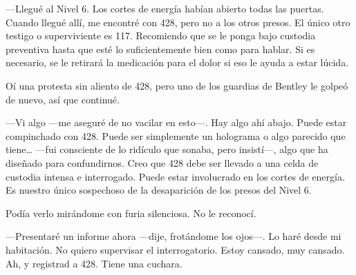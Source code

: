 ---Llegué al Nivel 6. Los cortes de energía habían abierto todas las
puertas. Cuando llegué allí, me encontré con 428, pero no a los otros
presos. El único otro testigo o superviviente es 117. Recomiendo que se
le ponga bajo custodia preventiva hasta que esté lo suficientemente bien
como para hablar. Si es necesario, se le retirará la medicación para el
dolor si eso le ayuda a estar lúcida.

Oí una protesta sin aliento de 428, pero uno de los guardias de Bentley
le golpeó de nuevo, así que continué.

---Vi algo ---me aseguré de no vacilar en esto---. Hay algo ahí abajo.
Puede estar compinchado con 428. Puede ser simplemente un holograma o
algo parecido que tiene\ldots{} ---fui consciente de lo ridículo que
sonaba, pero insistí---, algo que ha diseñado para confundirnos. Creo
que 428 debe ser llevado a una celda de custodia intensa e interrogado.
Puede estar involucrado en los cortes de energía. Es nuestro único
sospechoso de la desaparición de los presos del Nivel 6.

Podía verlo mirándome con furia silenciosa. No le reconocí.

---Presentaré un informe ahora ---dije, frotándome los ojos---. Lo haré
desde mi habitación. No quiero supervisar el interrogatorio. Estoy
cansado, muy cansado. Ah, y registrad a 428. Tiene una cuchara.
